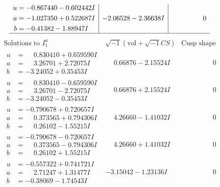 \documentclass[1p]{elsarticle_modified}
\theoremstyle{definition}
\newcommand{\I}{\sqrt{-1}}
\begin{document}
$$\begin{array}{c|c|c}
\begin{aligned}
u &= -0.867440 - 0.602442 I \\
a &= -1.027350 + 0.522687 I \\
b &= -0.41382 - 1.88947 I\end{aligned}
 & -2.06528 - 2.36638 I & \phantom{-0.000000 } 0\\
 \hline 
 \end{array}$$\newpage$$\begin{array}{c|c|c}  
\text{Solutions to }I^u_{1}& \I (\text{vol} + \sqrt{-1}CS) & \text{Cusp shape}\\
 \hline 
\begin{aligned}
u &= \phantom{-}0.830410 + 0.659590 I \\
a &= \phantom{-}3.26701 + 2.72075 I \\
b &= -3.24052 + 0.35453 I\end{aligned}
 & \phantom{-}0.66876 - 2.15524 I & \phantom{-0.000000 } 0 \\ \hline\begin{aligned}
u &= \phantom{-}0.830410 - 0.659590 I \\
a &= \phantom{-}3.26701 - 2.72075 I \\
b &= -3.24052 - 0.35453 I\end{aligned}
 & \phantom{-}0.66876 + 2.15524 I & \phantom{-0.000000 } 0 \\ \hline\begin{aligned}
u &= -0.790678 + 0.720657 I \\
a &= \phantom{-}0.373565 + 0.794306 I \\
b &= \phantom{-}0.26102 - 1.55215 I\end{aligned}
 & \phantom{-}4.26660 - 1.41032 I & \phantom{-0.000000 } 0 \\ \hline\begin{aligned}
u &= -0.790678 - 0.720657 I \\
a &= \phantom{-}0.373565 - 0.794306 I \\
b &= \phantom{-}0.26102 + 1.55215 I\end{aligned}
 & \phantom{-}4.26660 + 1.41032 I & \phantom{-0.000000 } 0 \\ \hline\begin{aligned}
u &= -0.557322 + 0.741721 I \\
a &= \phantom{-}2.71247 + 1.31477 I \\
b &= -0.38069 - 1.74543 I\end{aligned}
 & -3.15042 - 1.23136 I & \phantom{-0.000000 } 0 \\ \hline\begin{aligned}

\end{aligned}
\end{array}$$
\end{document}
